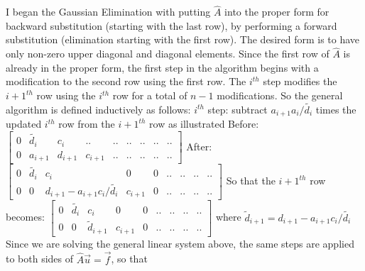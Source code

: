 \documentclass[11pt, oneside]{article}   	%
\begin{document}
I began the Gaussian Elimination with putting $\hat{A}$ into the proper form for backward substitution (starting with the last row), by performing a forward substitution (elimination starting with the first row). The desired form is to have only non-zero upper diagonal and diagonal elements. Since the first row of $\hat{A}$ is already in the proper form, the first step in the algorithm begins with a modification to the second row using the first row. The $i^{th}$ step modifies the ${i+1}^{th}$ row using the $i^{th}$ row for a total of $n-1$ modifications. So the general algorithm is defined inductively as follows:\newline
\newline
$i^{th}$ step: subtract $a_{i+1}a_i/\tilde{d_i}$ times the updated $i^{th}$ row from the ${i+1}^{th}$ row as illustrated\newline
\newline
Before:\newline
\newline
$\begin{bmatrix}
0 & \tilde{d_i} & c_i & ..& ..& ..& ..& ..& ..\\
0 & a_{i+1} & d_{i+1} & c_{i+1} & .. & ..& ..& ..& ..
\end{bmatrix}$\newline
\newline
After:\newline
\newline
$\begin{bmatrix}
0 & \tilde{d_i} & c_i & 0 & 0 & ..& ..& ..& ..\\
0 & 0 & d_{i+1} - a_{i+1}c_i/\tilde{d_i} & c_{i+1} & 0 & ..& ..& ..& ..
\end{bmatrix}$\newline
\newline
So that the ${i+1}^{th}$ row becomes:\newline
\newline
$\begin{bmatrix}
0 & \tilde{d_i} & c_i & 0 & 0 & ..& ..& ..& ..\\
0 & 0 & \tilde{d}_{i+1} & c_{i+1} & 0 & ..& ..& ..& ..
\end{bmatrix}$\newline
\newline
where $\tilde{d}_{i+1} = d_{i+1} - a_{i+1}c_i/\tilde{d_i}$ \newline
\newline
Since we are solving the general linear system above, the same steps are applied to both sides of $\hat{A}\vec{u} = \vec{f}$, so that\newline
\end{document}
